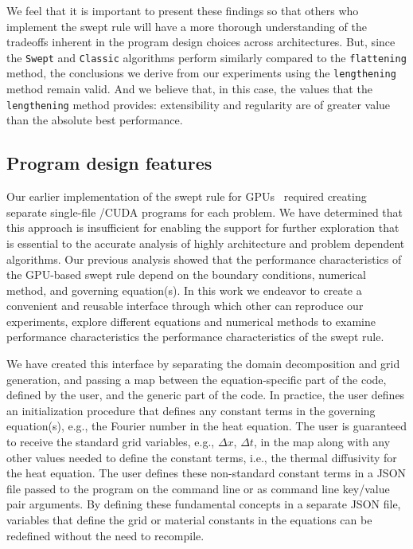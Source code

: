 We feel that it is important to present these findings so that others who implement the swept rule will
have a more thorough understanding of the tradeoffs inherent in the program design choices across architectures.
But, since the \texttt{Swept} and \texttt{Classic} algorithms perform similarly compared to the
\texttt{flattening} method, the conclusions we derive from our experiments using the \texttt{lengthening}
method remain valid.
And we believe that, in this case, the values that the \texttt{lengthening} method provides:
extensibility and regularity are of greater value than the absolute best performance.

\subsection{Program design features}

Our earlier implementation of the swept rule for GPUs~\cite{OurJCP} required creating separate single-file
\CC{}\slash CUDA programs for each problem.
We have determined that this approach is insufficient for enabling the support for further exploration that is essential to the accurate analysis of highly architecture
and problem dependent algorithms.
Our previous analysis showed that the performance characteristics of the GPU-based swept rule depend
on the boundary conditions, numerical method, and governing equation(s).
In this work we endeavor to create a convenient and reusable interface through which other can reproduce our experiments, explore different equations and numerical methods to examine performance characteristics the performance characteristics of the swept rule.

We have created this interface by separating the domain decomposition and grid generation, and passing
a map between the equation-specific part of the code, defined by the user, and the generic part of the code.
In practice, the user defines an initialization procedure that defines any constant terms in the
governing equation(s), e.g., the Fourier number in the heat equation.
The user is guaranteed to receive the standard grid variables, e.g., $\Delta x$, $\Delta t$, in the map
along with any other values needed to define the constant terms, i.e., the thermal diffusivity
for the heat equation.
The user defines these non-standard constant terms in a JSON file passed to the program on the command line
or as command line key/value pair arguments. By defining these fundamental concepts in a separate JSON
file, variables that define the grid or material constants in the equations can be redefined without
the need to recompile.

